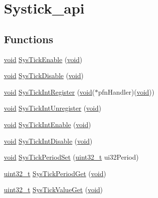 \hypertarget{group__systick__api}{}\section{Systick\+\_\+api}
\label{group__systick__api}
\subsection*{Functions}
\begin{DoxyCompactItemize}
\item 
\hyperlink{usb__devapi_8h_afabf60e7f57651d6d595a02c75f07cd0}{void} \hyperlink{group__systick__api_ga6fa7e44c447e4f861e63a2bf4d175afd}{Sys\+Tick\+Enable} (\hyperlink{usb__devapi_8h_afabf60e7f57651d6d595a02c75f07cd0}{void})
\item 
\hyperlink{usb__devapi_8h_afabf60e7f57651d6d595a02c75f07cd0}{void} \hyperlink{group__systick__api_ga0b993bfbd72abac7286c4f54369576f2}{Sys\+Tick\+Disable} (\hyperlink{usb__devapi_8h_afabf60e7f57651d6d595a02c75f07cd0}{void})
\item 
\hyperlink{usb__devapi_8h_afabf60e7f57651d6d595a02c75f07cd0}{void} \hyperlink{group__systick__api_ga4921bef366ee31ca37ef271abecedcb5}{Sys\+Tick\+Int\+Register} (\hyperlink{usb__devapi_8h_afabf60e7f57651d6d595a02c75f07cd0}{void}($\ast$pfn\+Handler)(\hyperlink{usb__devapi_8h_afabf60e7f57651d6d595a02c75f07cd0}{void}))
\item 
\hyperlink{usb__devapi_8h_afabf60e7f57651d6d595a02c75f07cd0}{void} \hyperlink{group__systick__api_ga606359e78b226889129995cf4f59ce09}{Sys\+Tick\+Int\+Unregister} (\hyperlink{usb__devapi_8h_afabf60e7f57651d6d595a02c75f07cd0}{void})
\item 
\hyperlink{usb__devapi_8h_afabf60e7f57651d6d595a02c75f07cd0}{void} \hyperlink{group__systick__api_gae9621f9d2bcf0cfe021cd5b7ff98edcc}{Sys\+Tick\+Int\+Enable} (\hyperlink{usb__devapi_8h_afabf60e7f57651d6d595a02c75f07cd0}{void})
\item 
\hyperlink{usb__devapi_8h_afabf60e7f57651d6d595a02c75f07cd0}{void} \hyperlink{group__systick__api_ga13ef9fe1d534da117371ae936bb089ee}{Sys\+Tick\+Int\+Disable} (\hyperlink{usb__devapi_8h_afabf60e7f57651d6d595a02c75f07cd0}{void})
\item 
\hyperlink{usb__devapi_8h_afabf60e7f57651d6d595a02c75f07cd0}{void} \hyperlink{group__systick__api_ga5892f33d986c614769aa4cfe20bfc80d}{Sys\+Tick\+Period\+Set} (\hyperlink{_p_e___types_8h_a33594304e786b158f3fb30289278f5af}{uint32\+\_\+t} ui32\+Period)
\item 
\hyperlink{_p_e___types_8h_a33594304e786b158f3fb30289278f5af}{uint32\+\_\+t} \hyperlink{group__systick__api_gab72fc40f3f868232eef127c6f3adb3b2}{Sys\+Tick\+Period\+Get} (\hyperlink{usb__devapi_8h_afabf60e7f57651d6d595a02c75f07cd0}{void})
\item 
\hyperlink{_p_e___types_8h_a33594304e786b158f3fb30289278f5af}{uint32\+\_\+t} \hyperlink{group__systick__api_ga6da4621404c875256a99d81137626c25}{Sys\+Tick\+Value\+Get} (\hyperlink{usb__devapi_8h_afabf60e7f57651d6d595a02c75f07cd0}{void})
\end{DoxyCompactItemize}


